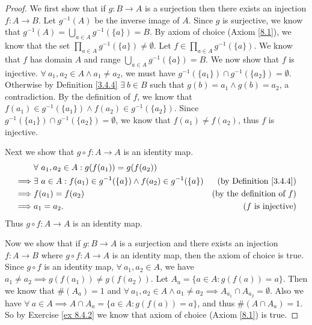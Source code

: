 \begin{proof}
    We first show that if \(g : B \to A\) is a surjection then there exists an injection \(f : A \to B\).
    Let \(g^{-1}(A)\) be the inverse image of \(A\).
    Since \(g\) is surjective, we know that \(g^{-1}(A) = \bigcup_{a \in A} g^{-1}(\{a\}) = B\).
    By axiom of choice (Axiom \ref{8.1}), we know that the set \(\prod_{a \in A} g^{-1}(\{a\}) \neq \emptyset\).
    Let \(f \in \prod_{a \in A} g^{-1}(\{a\})\).
    We know that \(f\) has domain \(A\) and range \(\bigcup_{a \in A} g^{-1}(\{a\}) = B\).
    We now show that \(f\) is injective.
    \(\forall\ a_1, a_2 \in A \land a_1 \neq a_2\), we must have \(g^{-1}(\{a_1\}) \cap g^{-1}(\{a_2\}) = \emptyset\).
    Otherwise by Definition \ref{3.4.4} \(\exists\ b \in B\) such that \(g(b) = a_1 \land g(b) = a_2\), a contradiction.
    By the definition of \(f\), we know that \(f(a_1) \in g^{-1}(\{a_1\}) \land f(a_2) \in g^{-1}(\{a_2\})\).
    Since \(g^{-1}(\{a_1\}) \cap g^{-1}(\{a_2\}) = \emptyset\), we know that \(f(a_1) \neq f(a_2)\), thus \(f\) is injective.

    Next we show that \(g \circ f : A \to A\) is an identity map.
    \begin{align*}
                 & \forall\ a_1, a_2 \in A : g(f(a_1)) = g(f(a_2))                                                                  \\
        \implies & \exists\ a \in A : f(a_1) \in g^{-1}(\{a\}) \land f(a_2) \in g^{-1}(\{a\}) & \text{(by Definition \ref{3.4.4})}  \\
        \implies & f(a_1) = f(a_2)                                                            & \text{(by the definition of \(f\))} \\
        \implies & a_1 = a_2.                                                                 & \text{(\(f\) is injective)}
    \end{align*}
    Thus \(g \circ f : A \to A\) is an identity map.

    Now we show that if \(g : B \to A\) is a surjection and there exists an injection \(f : A \to B\) where \(g \circ f : A \to A\) is an identity map, then the axiom of choice is true.
    Since \(g \circ f\) is an identity map, \(\forall\ a_1, a_2 \in A\), we have \(a_1 \neq a_2 \implies g(f(a_1)) \neq g(f(a_2))\).
    Let \(A_a = \{a \in A : g(f(a)) = a\}\).
    Then we know that \(\#(A_a) = 1\) and \(\forall\ a_1, a_2 \in A \land a_1 \neq a_2 \implies A_{a_1} \cap A_{a_2} = \emptyset\).
    Also we have \(\forall\ a \in A \implies A \cap A_a = \{a \in A : g(f(a)) = a\}\), and thus \(\#(A \cap A_a) = 1\).
    So by Exercise \ref{ex 8.4.2} we know that axiom of choice (Axiom \ref{8.1}) is true.
\end{proof}